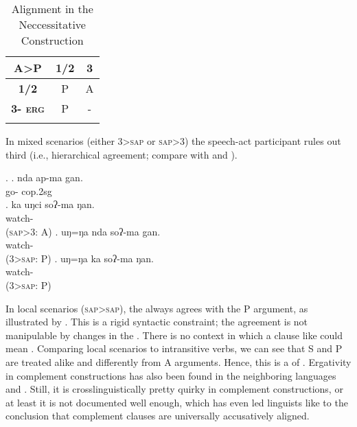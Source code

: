 \begin{table}[htp]
\begin{center}
\begin{tabular}{ccc}
\lsptoprule
{\bf A>P}	&{\bf 1/2}&{\bf 3}\\
\midrule
 {\bf 1/2}&P&A\\
 {\bf 3-	\textsc{erg}}	&P&-\\
\lspbottomrule
\end{tabular}
\caption{Alignment in the Neccessitative Construction}
\label{align-sum-cop}
\end{center} 
\end{table}


In mixed scenarios (either 3>\textsc{sap} or \textsc{sap}>3)  the speech-act participant rules out third  (i.e., hierarchical agreement; compare \Next[b] with \Next[c] and \Next[d]). 

\ex. \ag. nda  ap-ma gan.\\
 go- {\sc cop.2sg} \\
\bg. ka uŋci soʔ-ma   ŋan.\\
  watch-  \\  
	(\textsc{sap}>3: A)
\bg. uŋ=ŋa nda  soʔ-ma gan.\\
    watch-  \\  
	(3>\textsc{sap}: P)
\bg. uŋ=ŋa  ka soʔ-ma ŋan.\\
    watch-  \\  
	(3>\textsc{sap}: P)

In local scenarios (\textsc{sap}>\textsc{sap}), the  always agrees with the P argument, as illustrated by \Next. This is a rigid syntactic constraint; the agreement is not manipulable by changes in the . There is no context in which a clause like \Next[a] could mean . Comparing local scenarios to intransitive verbs, we can see that S and P are treated alike and differently from  A arguments. Hence, this is a  of  . Ergativity in complement constructions has also been found in the neighboring languages  \citep{Bickel2004Hidden, Bickeletal2001Syntactic} and  \citep{Bickeletal2010Ditransitives}. Still, it is crosslinguistically pretty quirky in complement constructions, or at least it is not documented well enough, which has even led linguists like \citet[135]{Dixon1994Ergativity}  to the conclusion that complement clauses are universally accusatively aligned. 


